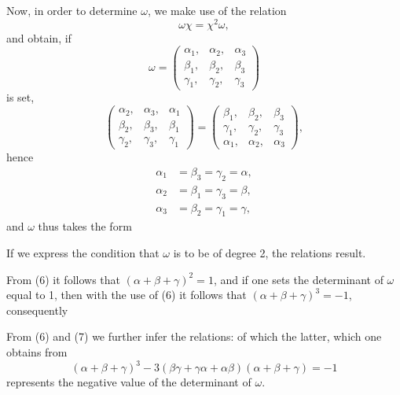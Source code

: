 Now, in order to determine $\omega$, we make use of the relation
\[
\omega \chi = \chi^2 \omega,
\]
and obtain, if
\[
\omega = \begin{pmatrix} \alpha_1, & \alpha_2, & \alpha_3 \\ \beta_1, & \beta_2, & \beta_3 \\ \gamma_1, & \gamma_2, & \gamma_3 \end{pmatrix}
\]
is set,
\[
\begin{pmatrix} \alpha_2, & \alpha_3, & \alpha_1 \\ \beta_2, & \beta_3, & \beta_1 \\ \gamma_2, & \gamma_3, & \gamma_1 \end{pmatrix}
=
\begin{pmatrix} \beta_1, & \beta_2, & \beta_3 \\ \gamma_1, & \gamma_2, & \gamma_3 \\ \alpha_1, & \alpha_2, & \alpha_3 \end{pmatrix},
\]
hence
\[
\begin{aligned}
\alpha_1 &= \beta_3 = \gamma_2 = \alpha, \\
\alpha_2 &= \beta_1 = \gamma_3 = \beta, \\
\alpha_3 &= \beta_2 = \gamma_1 = \gamma,
\end{aligned}
\]
and $\omega$ thus takes the form

If we express the condition that $\omega$ is to be of degree 2,
the relations
result.

From (6) it follows that $(\alpha + \beta + \gamma)^2 = 1$, and if one sets the
determinant of $\omega$ equal to 1, then with the use of (6) it follows that
$(\alpha + \beta + \gamma)^3 = -1$, consequently

From (6) and (7) we further infer the relations:
of which the latter, which one obtains from
\[
(\alpha + \beta + \gamma)^3 - 3(\beta\gamma + \gamma\alpha + \alpha\beta)(\alpha + \beta + \gamma) = -1
\]
represents the negative value of the determinant of $\omega$.

